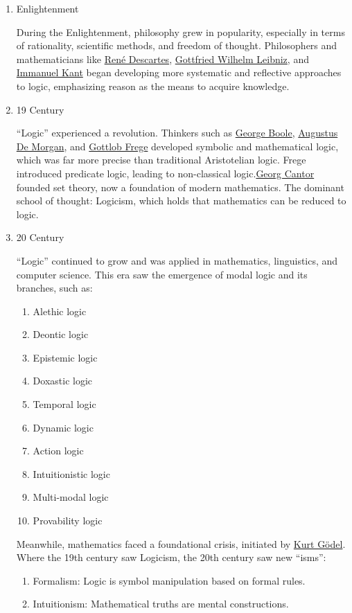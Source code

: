 \documentclass[12pt,a4paper,openany]{article}
\begin{document}
\begin{enumerate}
\item Enlightenment

During the Enlightenment, philosophy grew in popularity, especially in
terms of rationality, scientific methods, and freedom of thought.
Philosophers and mathematicians like
\href{https://en.wikipedia.org/wiki/Ren\%C3\%A9_Descartes}{René
Descartes},
\href{https://en.wikipedia.org/wiki/Gottfried_Wilhelm_Leibniz}{Gottfried
Wilhelm Leibniz}, and
\href{https://en.wikipedia.org/wiki/Immanuel_Kant}{Immanuel Kant} began
developing more systematic and reflective approaches to logic,
emphasizing reason as the means to acquire knowledge.

\item 19 Century

``Logic'' experienced a revolution. Thinkers such as
\href{https://simple.wikipedia.org/wiki/George_Boole}{George Boole},
\href{https://en.wikipedia.org/wiki/Augustus_De_Morgan}{Augustus De
Morgan}, and \href{https://id.wikipedia.org/wiki/Gottlob_Frege}{Gottlob
Frege} developed symbolic and mathematical logic, which was far more
precise than traditional Aristotelian logic. Frege introduced predicate
logic, leading to non-classical
logic.\href{https://id.wikipedia.org/wiki/Georg_Cantor}{Georg Cantor}
founded set theory, now a foundation of modern mathematics. The dominant
school of thought: Logicism, which holds that mathematics can be reduced
to logic.

\item 20 Century

``Logic'' continued to grow and was applied in mathematics, linguistics,
and computer science. This era saw the emergence of modal logic and its
branches, such as:

\begin{enumerate}
\item Alethic logic
\item Deontic logic
\item Epistemic logic
\item Doxastic logic
\item Temporal logic
\item Dynamic logic
\item Action logic
\item Intuitionistic logic
\item Multi-modal logic
\item Provability logic
\end{enumerate}

Meanwhile, mathematics faced a foundational crisis, initiated by \href{https://id.wikipedia.org/wiki/Kurt_G\%C3\%B6del}{Kurt Gödel}.
Where the 19th century saw Logicism, the 20th century saw new ``isms'':

\begin{enumerate}
\item
  Formalism: Logic is symbol manipulation based on formal rules.
\item
  Intuitionism: Mathematical truths are mental constructions.
\end{enumerate}
\end{enumerate}
\end{document}
